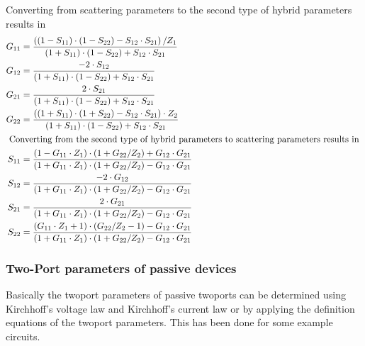 \documentclass[10pt]{report}
\begin{document}
Converting from scattering parameters to the second type of hybrid
parameters results in
\begin{align}
G_{11} &= \dfrac{\left(\left(1 - S_{11}\right)\cdot \left(1 - S_{22}\right) - S_{12}\cdot S_{21}\right) / Z_{1}}{\left(1 + S_{11}\right)\cdot \left(1 - S_{22}\right) + S_{12}\cdot S_{21}}\\
G_{12} &= \dfrac{-2\cdot S_{12}}{\left(1 + S_{11}\right)\cdot \left(1 - S_{22}\right) + S_{12}\cdot S_{21}}\\
G_{21} &= \dfrac{2\cdot S_{21}}{\left(1 + S_{11}\right)\cdot \left(1 - S_{22}\right) + S_{12}\cdot S_{21}}\\
G_{22} &= \dfrac{\left(\left(1 + S_{11}\right)\cdot \left(1 + S_{22}\right) - S_{12}\cdot S_{21}\right)\cdot Z_{2}}{\left(1 + S_{11}\right)\cdot \left(1 - S_{22}\right) + S_{12}\cdot S_{21}}\\
\intertext{
Converting from the second type of hybrid parameters to scattering
parameters results in
}
S_{11} &= \dfrac{\left(1 - G_{11}\cdot Z_{1}\right)\cdot \left(1 + G_{22} / Z_{2}\right) + G_{12}\cdot G_{21}}{\left(1 + G_{11}\cdot Z_{1}\right)\cdot \left(1 + G_{22} / Z_{2}\right) - G_{12}\cdot G_{21}}\\
S_{12} &= \dfrac{-2\cdot G_{12}}{\left(1 + G_{11} \cdot Z_{1}\right)\cdot \left(1 + G_{22} / Z_{2}\right) - G_{12}\cdot G_{21}}\\
S_{21} &= \dfrac{2\cdot G_{21}}{\left(1 + G_{11} \cdot Z_{1}\right)\cdot \left(1 + G_{22} / Z_{2}\right) - G_{12}\cdot G_{21}}\\
S_{22} &= \dfrac{\left(G_{11} \cdot Z_{1} + 1\right)\cdot \left(G_{22} / Z_{2} - 1\right) - G_{12}\cdot G_{21}}{\left(1 + G_{11} \cdot Z_{1}\right)\cdot \left(1 + G_{22} / Z_{2}\right) - G_{12}\cdot G_{21}}
\end{align}

\subsubsection{Two-Port parameters of passive devices}

Basically the twoport parameters of passive twoports can be determined
using Kirchhoff's voltage law and Kirchhoff's current law or by
applying the definition equations of the twoport parameters.  This has
been done \cite{Weissgerber} for some example circuits.
\end{document}
